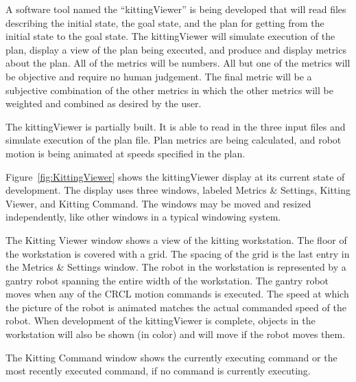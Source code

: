 A software tool named the ``kittingViewer'' is being developed that will
read files describing the initial state, the goal state, and the plan for
getting from the initial state to the goal state. The kittingViewer will
simulate execution of the plan, display a view of the plan being executed,
and produce and display metrics about the plan.  All of the metrics will be
numbers. All but one of the metrics will be objective and require no human
judgement. The final metric will be a subjective combination of the other
metrics in which the other metrics will be weighted and combined as desired
by the user.

The kittingViewer is partially built. It is able to read in the three
input files and simulate execution of the plan file. Plan metrics are
being calculated, and robot motion is being animated at speeds specified
in the plan.

Figure~\ref{fig:KittingViewer} shows the kittingViewer display at its
current state of development. The display uses three windows, labeled
Metrics \& Settings, Kitting Viewer, and Kitting Command. The windows may
be moved and resized independently, like other windows in a typical
windowing system. 

The Kitting Viewer window shows a view of the kitting workstation. The
floor of the workstation is covered with a grid. The spacing of the grid is
the last entry in the Metrics \& Settings window. The robot in the
workstation is represented by a gantry robot spanning the entire width of
the workstation.  The gantry robot moves when any of the CRCL motion
commands is executed.  The speed at which the picture of the robot is
animated matches the actual commanded speed of the robot.  When development
of the kittingViewer is complete, objects in the workstation will also be
shown (in color) and will move if the robot moves them.

The Kitting Command window shows the currently executing command or the
most recently executed command, if no command is currently executing.

